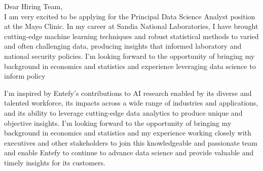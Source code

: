 \documentclass[10pt]{article}
\begin{document}
	

\noindent Dear Hiring Team,\\

I am very excited to be applying for the Principal Data Science Analyst position at the Mayo Clinic. In my career at Sandia National Laboratories, I have brought cutting-edge machine learning techniques and robust statistical methods to varied and often challenging data, producing insights that informed laboratory and national security policies. I'm looking forward to the opportunity of bringing my background in economics and statistics and experience leveraging data science to inform policy

I'm inspired by Entefy's contributions to AI research enabled by its diverse and talented workforce, its impacts across a wide range of industries and applications, and its ability to leverage cutting-edge data analytics to produce unique and objective insights. I'm looking forward to the opportunity of bringing my background in economics and statistics and my experience working closely with executives and other stakeholders to join this knowledgeable and passionate team and enable Entefy to continue to advance data science and provide valuable and timely insights for its customers.
\end{document}
